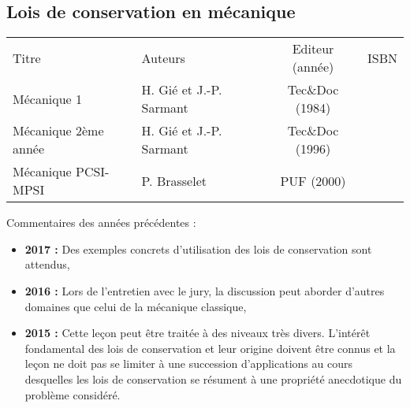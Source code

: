 \begin{headerBlock}
  \chapter{Lois de conservation en mécanique}
    \label{LP_LoisConservation}
\end{headerBlock}

\begin{center}
\begin{tabularx}{\textwidth}{| X | X | c | c |}
  \hline
  \rowcolor{gray!20}\multicolumn{4}{c}{Bibliographie de la leçon : } \\
  \hline 
  Titre & Auteurs & Editeur (année) & ISBN \\
  \hline
  Mécanique 1 & H. Gié et J.-P. Sarmant & Tec\&Doc (1984) & \\
  \hline
  Mécanique 2ème année & H. Gié et J.-P. Sarmant & Tec\&Doc (1996) & \\
  \hline
  Mécanique PCSI-MPSI & P. Brasselet & PUF (2000) & \\
  \hline
\end{tabularx}
\end{center}

\begin{reportBlock}{Commentaires des années précédentes :}
    \begin{itemize}
        \item \textbf{2017 :} Des exemples concrets d’utilisation des lois de conservation sont attendus,
        \item \textbf{2016 :} Lors de l’entretien avec le jury, la discussion peut aborder d’autres domaines que celui de la mécanique classique,
        \item \textbf{2015 :} Cette leçon peut être traitée à des niveaux très divers. L’intérêt fondamental des lois de conservation et leur origine doivent être connus et la leçon ne doit pas se limiter à une succession d’applications au cours desquelles les lois de conservation se résument à une propriété anecdotique du problème considéré.
    \end{itemize}
\end{reportBlock}

